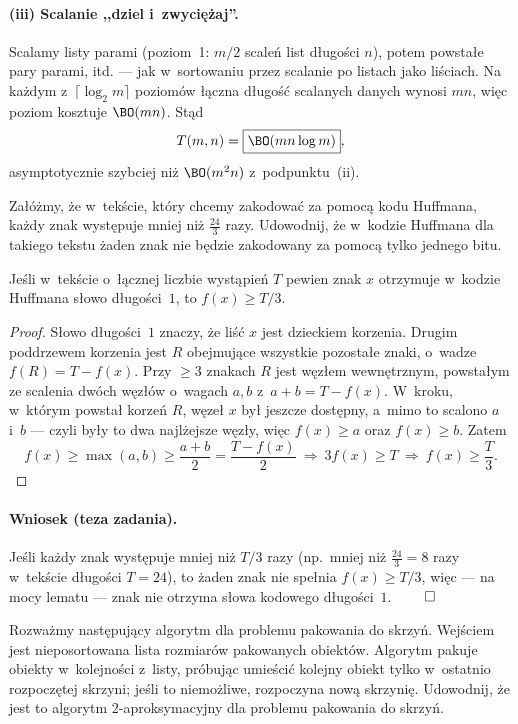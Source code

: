 \paragraph{(iii) Scalanie ,,dziel i~zwyciężaj''.}
Scalamy listy parami (poziom~1: $m/2$ scaleń list długości $n$), potem powstałe
pary parami, itd. --- jak w~sortowaniu przez scalanie po listach jako liściach.
Na każdym z~$\lceil\log_2 m\rceil$ poziomów łączna długość scalanych danych
wynosi $mn$, więc poziom kosztuje $\BO(mn)$. Stąd
\[
	T(m,n)=\boxed{\BO(mn\log m)},
\]
asymptotycznie szybciej niż $\BO(m^2 n)$ z~podpunktu~(ii).

\clearpage
\begin{zadanie}
	Załóżmy, że w~tekście, który chcemy zakodować za pomocą kodu Huffmana, każdy
	znak występuje mniej niż $\frac{24}{3}$ razy. Udowodnij, że w~kodzie Huffmana
	dla takiego tekstu żaden znak nie będzie zakodowany za pomocą tylko jednego
	bitu.
\end{zadanie}

\begin{lemma}
	Jeśli w~tekście o~łącznej liczbie wystąpień $T$ pewien znak $x$ otrzymuje
	w~kodzie Huffmana słowo długości~$1$, to $f(x)\geq T/3$.
\end{lemma}
\begin{proof}
	Słowo długości~$1$ znaczy, że liść $x$ jest dzieckiem korzenia. Drugim
	poddrzewem korzenia jest $R$ obejmujące wszystkie pozostałe znaki, o~wadze
	$f(R)=T-f(x)$. Przy $\geq 3$ znakach $R$ jest węzłem wewnętrznym, powstałym
	ze scalenia dwóch węzłów o~wagach $a,b$ z~$a+b=T-f(x)$. W~kroku, w~którym
	powstał korzeń $R$, węzeł $x$ był jeszcze dostępny, a~mimo to scalono $a$
	i~$b$ --- czyli były to dwa najlżejsze węzły, więc $f(x)\geq a$ oraz
	$f(x)\geq b$. Zatem
	\[
		f(x)\geq\max(a,b)\geq\frac{a+b}{2}=\frac{T-f(x)}{2}
		\ \Longrightarrow\ 3f(x)\geq T\ \Longrightarrow\ f(x)\geq\frac{T}{3}.
	\]
\end{proof}

\paragraph{Wniosek (teza zadania).}
Jeśli każdy znak występuje mniej niż $T/3$ razy (np.\ mniej niż
$\tfrac{24}{3}=8$ razy w~tekście długości $T=24$), to żaden znak nie spełnia
$f(x)\geq T/3$, więc --- na mocy lematu ---  znak nie otrzyma słowa
kodowego długości~$1$. $\qed$

\clearpage
\begin{zadanie}
	Rozważmy następujący algorytm dla problemu pakowania do skrzyń. Wejściem jest
	nieposortowana lista rozmiarów pakowanych obiektów. Algorytm pakuje obiekty
	w~kolejności z~listy, próbując umieścić kolejny obiekt tylko w~ostatnio
	rozpoczętej skrzyni; jeśli to niemożliwe, rozpoczyna nową skrzynię. Udowodnij,
	że jest to algorytm $2$-aproksymacyjny dla problemu pakowania do skrzyń.
\end{zadanie}

